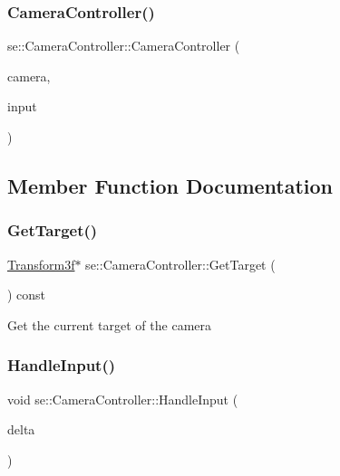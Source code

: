 \subsubsection{\texorpdfstring{Camera\+Controller()}{CameraController()}}
{\footnotesize\ttfamily se\+::\+Camera\+Controller\+::\+Camera\+Controller (\begin{DoxyParamCaption}\item[{\mbox{\hyperlink{classse_1_1_abstract_camera}{Abstract\+Camera}} $\ast$}]{camera,  }\item[{\mbox{\hyperlink{classse_1_1_input}{Input}} $\ast$}]{input }\end{DoxyParamCaption})}



\subsection{Member Function Documentation}
\mbox{\label{classse_1_1_camera_controller_a5b63115409d37fd1aa893e27bb2444a3}} 
\subsubsection{\texorpdfstring{Get\+Target()}{GetTarget()}}
{\footnotesize\ttfamily \mbox{\hyperlink{classse_1_1_transform3f}{Transform3f}}$\ast$ se\+::\+Camera\+Controller\+::\+Get\+Target (\begin{DoxyParamCaption}{ }\end{DoxyParamCaption}) const}

Get the current target of the camera \mbox{\label{classse_1_1_camera_controller_ab6bbdc5adfe20a96d28a53258e5de1a6}} 
\subsubsection{\texorpdfstring{Handle\+Input()}{HandleInput()}}
{\footnotesize\ttfamily void se\+::\+Camera\+Controller\+::\+Handle\+Input (\begin{DoxyParamCaption}\item[{float}]{delta }\end{DoxyParamCaption})}

